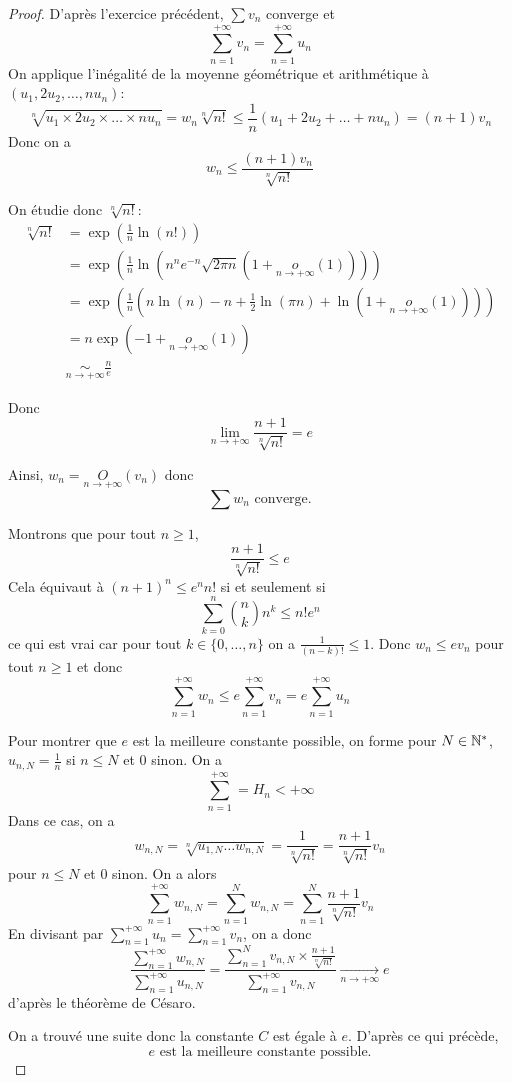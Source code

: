 \begin{proof}
	D'après l'exercice précédent, $\sum v_{n}$ converge et 
	$$\sum_{n=1}^{+\infty}v_{n}=\sum_{n=1}^{+\infty}u_{n}$$
	On applique l'inégalité de la moyenne géométrique et arithmétique à $(u_{1},2u_{2},\dots,nu_{n})$:
	$$\sqrt[n]{u_{1}\times 2u_{2}\times\dots\times nu_{n}}=w_{n}\sqrt[n]{n!}\leqslant\frac{1}{n}(u_{1}+2u_{2}+\dots+nu_{n})=(n+1)v_{n}$$
	Donc on a 
	$$w_{n}\leqslant\frac{(n+1)v_{n}}{\sqrt[n]{n!}}$$

	On étudie donc $\sqrt[n]{n!}$:
	\begin{align*}
		\sqrt[n]{n!}
		&=\exp\left(\frac{1}{n}\ln(n!)\right)\\
		&=\exp\left(\frac{1}{n}\ln\left(n^{n}e^{-n}\sqrt{2\pi n}\left(1+\underset{n\to+\infty}{o}\left(1\right)\right)\right)\right)\\
		&=\exp\left(\frac{1}{n}\left(n\ln\left(n\right)-n+\frac{1}{2}\ln\left(\pi n\right)+\ln\left(1+\underset{n\to+\infty}{o}\left(1\right)\right)\right)\right)\\
		&=n\exp\left(-1+\underset{n\to+\infty}{o}\left(1\right)\right)\\
		&\underset{n\to+\infty}{\sim}\frac{n}{e}
	\end{align*}

	Donc $$\lim\limits_{n\to+\infty}\frac{n+1}{\sqrt[n]{n!}}=e$$

	Ainsi, $w_{n}=\underset{n\to+\infty}{O}(v_{n})$ donc 
	$$\boxed{\sum w_{n}\text{ converge.}}$$

	Montrons que pour tout $n\geqslant1$, 
	$$\frac{n+1}{\sqrt[n]{n!}}\leqslant e$$
	Cela équivaut à $(n+1)^{n}\leqslant e^{n}n!$ si et seulement si 
	$$\sum_{k=0}^{n}\binom{n}{k}n^{k}\leqslant n!e^{n}$$
	ce qui est vrai car pour tout $k\in\{0,\dots,n\}$ on a $\frac{1}{(n-k)!}\leqslant1$.
	Donc $w_{n}\leqslant ev_{n}$ pour tout $n\geqslant1$ et donc 
	$$\boxed{\sum_{n=1}^{+\infty}w_{n}\leqslant e\sum_{n=1}^{+\infty}v_{n}=e\sum_{n=1}^{+\infty}u_{n}}$$

	Pour montrer que $e$ est la meilleure constante possible, on forme pour $N\in\mathbb{N}^{*}$, $u_{n,N}=\frac{1}{n}$ si $n\leqslant N$ et 0 sinon.
	On a 
	$$\sum_{n=1}^{+\infty}=H_{n}<+\infty$$
	Dans ce cas, on a 
	$$w_{n,N}=\sqrt[n]{u_{1,N}\dots w_{n,N}}=\frac{1}{\sqrt[n]{n!}}=\frac{n+1}{\sqrt[n]{n!}}v_{n}$$
	pour $n\leqslant N$ et 0 sinon.
	On a alors 
	$$\sum_{n=1}^{+\infty}w_{n,N}=\sum_{n=1}^{N}w_{n,N}=\sum_{n=1}^{N}\frac{n+1}{\sqrt[n]{n!}}v_{n}$$
	En divisant par $\sum_{n=1}^{+\infty}u_{n}=\sum_{n=1}^{+\infty}v_{n}$, on a donc 
	$$\frac{\sum_{n=1}^{+\infty}w_{n,N}}{\sum_{n=1}^{+\infty}u_{n,N}}=\frac{\sum_{n=1}^{N}v_{n,N}\times\frac{n+1}{\sqrt[n]{n!}}}{\sum_{n=1}^{+\infty}v_{n,N}}\xrightarrow[n\to+\infty]{}e$$
	d'après le théorème de Césaro.

	On a trouvé une suite donc la constante $C$ est égale à $e$. D'après ce qui précède, 
	$$\boxed{e\text{ est la meilleure constante possible.}}$$
\end{proof}

